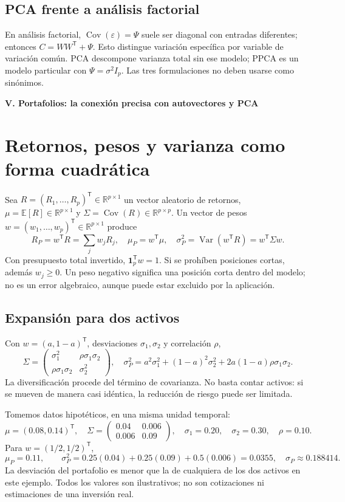 \documentclass[11pt,a4paper]{article}
\newcommand{\R}{\mathbb R}
\newcommand{\E}{\mathbb E}
\newcommand{\T}{^{\mathsf T}}
\DeclareMathOperator{\Var}{Var}
\DeclareMathOperator{\Cov}{Cov}
\newcommand{\ones}{\mathbf 1}
\theoremstyle{definition}
\newcommand{\parte}[1]{\par\bigskip\Needspace{8\baselineskip}\begin{center}{\Large\bfseries\color{azul}#1}\end{center}}
\begin{document}
\subsection{PCA frente a análisis factorial}
En análisis factorial, $\Cov(\varepsilon)=\Psi$ suele ser diagonal con entradas diferentes; entonces $C=WW\T+\Psi$. Esto distingue variación específica por variable de variación común. PCA descompone varianza total sin ese modelo; PPCA es un modelo particular con $\Psi=\sigma^2I_p$. Las tres formulaciones no deben usarse como sinónimos.

\parte{V. Portafolios: la conexión precisa con autovectores y PCA}
\section{Retornos, pesos y varianza como forma cuadrática}
Sea $R=(R_1,\ldots,R_p)\T\in\R^{p\times1}$ un vector aleatorio de retornos, $\mu=\E[R]\in\R^{p\times1}$ y $\Sigma=\Cov(R)\in\R^{p\times p}$. Un vector de pesos $w=(w_1,\ldots,w_p)\T\in\R^{p\times1}$ produce
\[
R_P=w\T R=\sum_jw_jR_j,\quad
\mu_P=w\T\mu,\quad
\sigma_P^2=\Var(w\T R)=w\T\Sigma w.
\]
Con presupuesto total invertido, $\ones_p\T w=1$. Si se prohíben posiciones cortas, además $w_j\ge0$. Un peso negativo significa una posición corta dentro del modelo; no es un error algebraico, aunque puede estar excluido por la aplicación.
\subsection{Expansión para dos activos}
Con $w=(a,1-a)\T$, desviaciones $\sigma_1,\sigma_2$ y correlación $\rho$,
\[
\Sigma=\begin{pmatrix}\sigma_1^2&\rho\sigma_1\sigma_2\\\rho\sigma_1\sigma_2&\sigma_2^2\end{pmatrix},\quad
\sigma_P^2=a^2\sigma_1^2+(1-a)^2\sigma_2^2+2a(1-a)\rho\sigma_1\sigma_2.
\]
La diversificación procede del término de covarianza. No basta contar activos: si se mueven de manera casi idéntica, la reducción de riesgo puede ser limitada.
\begin{ejemplo}
Tomemos datos hipotéticos, en una misma unidad temporal:
\[
\mu=(0.08,0.14)\T,\quad
\Sigma=\begin{pmatrix}0.04&0.006\\0.006&0.09\end{pmatrix},\quad
\sigma_1=0.20,\quad\sigma_2=0.30,\quad\rho=0.10.
\]
Para $w=(1/2,1/2)\T$,
\[
\mu_P=0.11,\qquad \sigma_P^2=0.25(0.04)+0.25(0.09)+0.5(0.006)=0.0355,
\quad\sigma_P\approx0.188414.
\]
La desviación del portafolio es menor que la de cualquiera de los dos activos en este ejemplo. Todos los valores son ilustrativos; no son cotizaciones ni estimaciones de una inversión real.
\end{ejemplo}
\end{document}
